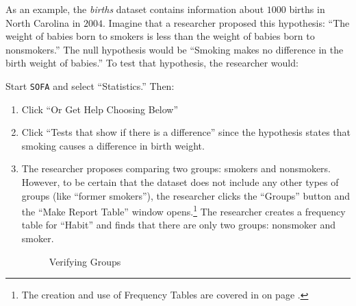 As an example, the \textit{births} dataset contains information about $ 1000 $ births in North Carolina in $ 2004 $. Imagine that a researcher proposed this hypothesis: ``The weight of babies born to smokers is less than the weight of babies born to nonsmokers.'' The null hypothesis would be ``Smoking makes no difference in the birth weight of babies.'' To test that hypothesis, the researcher would:

Start \texttt{SOFA} and select ``Statistics.'' Then:

\begin{enumerate}
  \item Click ``Or Get Help Choosing Below''
  \item Click ``Tests that show if there is a difference'' since the hypothesis states that smoking causes a difference in birth weight.
  \item The researcher proposes comparing two groups: smokers and nonsmokers. However, to be certain that the dataset does not include any other types of groups (like ``former smokers''), the researcher clicks the ``Groups'' button and the ``Make Report Table'' window opens.\footnote{The creation and use of Frequency Tables are covered in  on page \pageref{fre:frequency_tables}.} The researcher creates a frequency table for ``Habit'' and finds that there are only two groups: nonsmoker and smoker.
  
  \begin{figure}[H]
    \begin{center}
      \caption{Verifying Groups}
    \end{center}
  \end{figure}


\end{enumerate}
